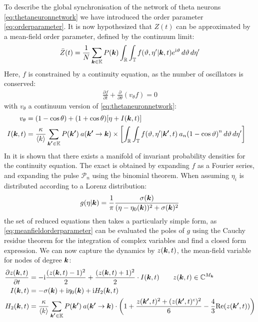To describe the global synchronisation of the network of theta neurons \eqref{eq:thetaneuronnetwork} we have introduced the order parameter \eqref{eq:orderparameter}. It is now hypothesized that $Z(t)$ can be approximated by a mean-field order parameter, defined by the continuum limit:
\begin{align}
\bar{Z}(t)= \frac{1}{N} \sum_{\k \in \K}P(\k) \int_{\R} \int_{\T} f\left(\vartheta, \eta^{\prime} | \k, t\right) e^{\ic \vartheta} \mathop{d \vartheta} \mathop{d \eta^{\prime}} \label{eq:meanfieldorderparameter}
\end{align}
Here, $f$ is constrained by a continuity equation, as the number of oscillators is conserved:
\begin{align}
\frac{\partial f}{\partial t}+\frac{\partial}{\partial \theta}\left(v_{\theta} f\right) = 0 \label{eq:transportequation}
\end{align}
with $v_{\theta}$ a continuum version of \eqref{eq:thetaneuronnetwork}:
\begin{align*}
v_{\theta} &= (1-\cos \theta)+(1+\cos \theta) \left[\eta + I(\k,t) \right]\\
I(\k,t) &= \frac{\kappa}{\kmean}\sum_{\kacc \in \K} P(\kacc ) \:a\left(\kacc \rightarrow \k \right) \times \left[ \int_{\R} \int_{\T} f\left(\vartheta, \eta^{\prime} | \kacc, t\right) \: a_{n} \left(1-\cos \vartheta\right)^{n} \mathop{d \vartheta} \mathop{d \eta^{\prime}} \right] &
\end{align*}
In \cite{OttAntonsen2008} it is shown that there exists a manifold of invariant probability densities for the continuity equation. The exact \MFR is obtained by expanding $f$ as a Fourier series, and expanding the pulse $\mathcal{P}_n$ using the binomial theorem. When assuming $\eta_i$ is distributed according to a Lorenz distribution:
\begin{align}
g(\eta |{\boldsymbol{k}})=\frac{1}{\pi} \frac{\sigma({\boldsymbol{k}})}{(\eta-\eta_{0}({\boldsymbol{k}}))^{2}+\sigma({\boldsymbol{k}})^{2}} \label{eq:Lorentzpdf}
\end{align}
the set of reduced equations then takes a particularly simple form, as \eqref{eq:meanfieldorderparameter} can be evaluated the poles of $g$ using the Cauchy residue theorem for the integration of complex variables and find a closed form expression. We can now capture the dynamics by $z({\boldsymbol{k}},t)$, the mean-field variable for nodes of degree ${\boldsymbol{k}}$:
\begin{align}
\frac{\partial z(\k, t)}{\partial t} &= -\ic \frac{(z(\k, t)-1)^{2}}{2} + \frac{(z(\k, t)+1)^{2}}{2} \cdot I(\k, t) \qquad z(\k,t) \in \C^{M_\k} \nonumber \\
I(\k, t) &= -\sigma(\k) + \ic \eta_{0}(\k) + \ic H_2(\k,t) \label{eq:OttAntonsenSystemFull} \\
H_2(\k,t) &= \frac{\kappa}{\kmean} \sum_{\kacc \in \K} P\left(\kacc\right) \: a\left(\kacc \rightarrow \k\right) \cdot \left( 1 + \frac{z(\kacc, t)^2 + (z(\kacc, t)^c )^2}{6} - \frac{4}{3} \Re(z(\kacc, t)) \right) \nonumber
\end{align}

